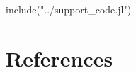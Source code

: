 \documentclass[fullbook]{book_template}
\begin{document}
\frontmatter



\tableofcontents


\mainmatter
\begin{jlcode}
	include("../support_code.jl")
\end{jlcode}

\appendix


\solutions
\backmatter
\chapter*{References}
\printbibliography[heading=none]

\printindex
\end{document}
